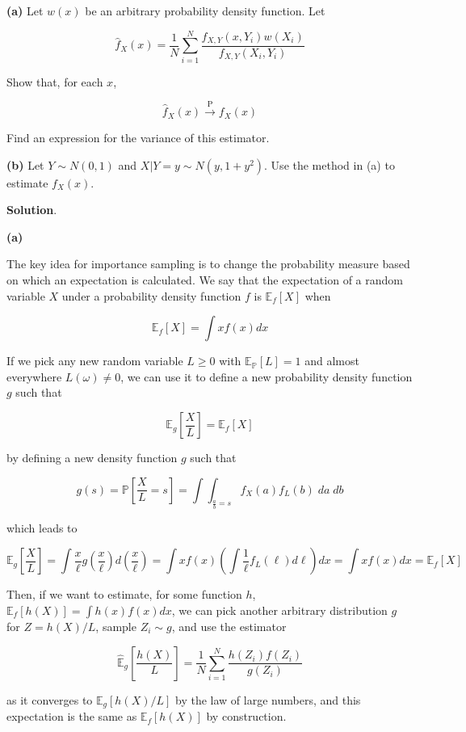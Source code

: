 \textbf{(a)} Let \(w(x)\) be an arbitrary probability density function.
Let

\[ \hat{f}_X(x) = \frac{1}{N} \sum_{i=1}^N \frac{f_{X, Y}(x, Y_i)  w(X_i)}{f_{X, Y}(X_i, Y_i)} \]

Show that, for each \(x\),

\[ \hat{f}_X(x) \xrightarrow{\text{P}} f_X(x) \]

Find an expression for the variance of this estimator.

\textbf{(b)} Let \(Y \sim N(0, 1)\) and
\(X | Y = y \sim N(y, 1 + y^2)\). Use the method in (a) to estimate
\(f_X(x)\).

\textbf{Solution}.

\textbf{(a)}

The key idea for importance sampling is to change the probability
measure based on which an expectation is calculated. We say that the
expectation of a random variable \(X\) under a probability density
function \(f\) is \(\mathbb{E}_f[X]\) when

\[ \mathbb{E}_f[X] = \int x f(x) dx\]

If we pick any new random variable \(L \geq 0\) with
\(\mathbb{E}_{\mathbb{P}}[L] = 1\) and almost everywhere
\(L(\omega) \neq 0\), we can use it to define a new probability density
function \(g\) such that

\[ \mathbb{E}_g\left[\frac{X}{L}\right] = \mathbb{E}_f[X] \]

by defining a new density function \(g\) such that

\[ g\left(s\right) = \mathbb{P}\left[\frac{X}{L} = s\right] = \int \int_{\frac{a}{b} = s} f_X(a) f_L(b) \; da\; db \]

which leads to

\[ \mathbb{E}_g\left[\frac{X}{L}\right] = \int \frac{x}{\ell} g\left(\frac{x}{\ell}\right) d \left( \frac{x}{\ell} \right) = \int x f(x) \left( \int \frac{1}{\ell} f_L(\ell) d\ell \right) dx  = \int x f(x) dx  = \mathbb{E}_f[X]\]

Then, if we want to estimate, for some function \(h\),
\(\mathbb{E}_f[h(X)] = \int h(x) f(x) dx\), we can pick another
arbitrary distribution \(g\) for \(Z = h(X) / L\), sample
\(Z_i \sim g\), and use the estimator

\[ \hat{\mathbb{E}}_g\left[\frac{h(X)}{L}\right] = \frac{1}{N} \sum_{i=1}^N \frac{h(Z_i) f(Z_i)}{g(Z_i)} \]

as it converges to \(\mathbb{E}_g\left[h(X) / L\right]\) by the law of
large numbers, and this expectation is the same as
\(\mathbb{E}_f[h(X)]\) by construction.

